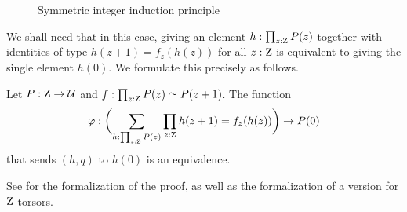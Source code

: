 \documentclass[a4paper,12pt]{amsart}
\begin{document}
\begin{figure}[h]
  \centering
  \caption{Symmetric integer induction principle}
  \label{fig:integers-induction-symmetric}
\end{figure}

We shall need that in this case, giving an element $h:\prod_{z:\mathrm{Z}}P(z)$
together with identities of type $h(z+1) = f_z(h(z))$ for all $z:\mathrm{Z}$
is equivalent to giving the single element $h(0)$.
We formulate this precisely as follows.

\begin{theorem}\label{thm:integers-univ-symm}
  Let $P : \mathrm{Z} \to \mathcal{U}$ and $f : \prod_{z:\mathrm{Z}}P(z) \simeq P(z+1)$. The function
  \[
    \varphi : \biggl(\sum_{h:\prod_{z:\mathrm{Z}}P(z)}\prod_{z:\mathrm{Z}}h(z+1) = f_z(h(z))\biggr) \to P(0)
  \]
  that sends $(h,q)$ to $h(0)$ is an equivalence.
\end{theorem}

See \cite{Z-induction-formalized,Z-induction-torsor-formalized} for the formalization of the proof,
as well as the formalization of a version for $\mathrm{Z}$-torsors.
\end{document}
